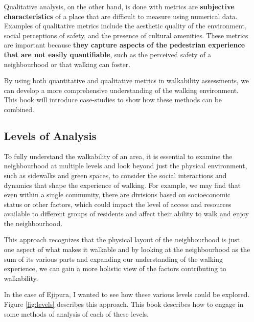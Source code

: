 \documentclass[
]{latex/krantz}
\begin{document}
Qualitative analysis, on the other hand, is done with metrics are \textbf{subjective characteristics} of a place that are difficult to measure using numerical data. Examples of qualitative metrics include the aesthetic quality of the environment, social perceptions of safety, and the presence of cultural amenities. These metrics are important because \textbf{they capture aspects of the pedestrian experience that are not easily quantifiable}, such as the perceived safety of a neighbourhood or that walking can foster.

By using both quantitative and qualitative metrics in walkability assessments, we can develop a more comprehensive understanding of the walking environment. This book will introduce case-studies to show how these methods can be combined.

\hypertarget{levels}{%
\subsection{Levels of Analysis}\label{levels}}

To fully understand the walkability of an area, it is essential to examine the neighbourhood at multiple levels and look beyond just the physical environment, such as sidewalks and green spaces, to consider the social interactions and dynamics that shape the experience of walking. For example, we may find that even within a single community, there are divisions based on socioeconomic status or other factors, which could impact the level of access and resources available to different groups of residents and affect their ability to walk and enjoy the neighbourhood.

This approach recognizes that the physical layout of the neighbourhood is just one aspect of what makes it walkable and by looking at the neighbourhood as the sum of its various parts and expanding our understanding of the walking experience, we can gain a more holistic view of the factors contributing to walkability.

In the case of Ejipura, I wanted to see how these various levels could be explored. Figure \ref{fig:levels} describes this approach. This book describes how to engage in some methods of analysis of each of these levels.
\end{document}
